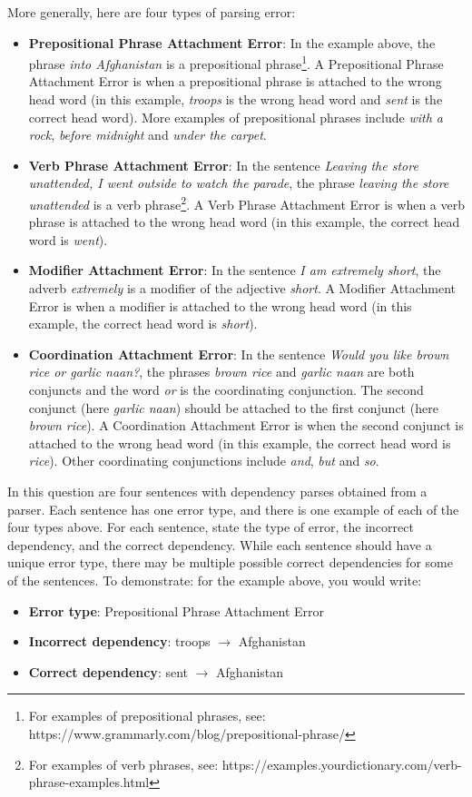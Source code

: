 \begin{parts}
More generally, here are four types of parsing error:
\begin{itemize}
    \item \textbf{Prepositional Phrase Attachment Error}: In the example above, the phrase \textit{into Afghanistan} is a prepositional phrase\footnote{For examples of prepositional phrases, see: https://www.grammarly.com/blog/prepositional-phrase/}.
    A Prepositional Phrase Attachment Error is when a prepositional phrase is attached to the wrong head word (in this example, \textit{troops} is the wrong head word and \textit{sent} is the correct head word).
    More examples of prepositional phrases include \textit{with a rock}, \textit{before midnight} and \textit{under the carpet}. 
    \item \textbf{Verb Phrase Attachment Error}: In the sentence \textit{Leaving the store unattended, I went outside to watch the parade}, the phrase \textit{leaving the store unattended} is a verb phrase\footnote{For examples of verb phrases, see: https://examples.yourdictionary.com/verb-phrase-examples.html}. 
    A Verb Phrase Attachment Error is when a verb phrase is attached to the wrong head word (in this example, the correct head word is \textit{went}).
    \item \textbf{Modifier Attachment Error}: In the sentence \textit{I am extremely short}, the adverb \textit{extremely} is a modifier of the adjective \textit{short}. A Modifier Attachment Error is when a modifier is attached to the wrong head word (in this example, the correct head word is \textit{short}).
    \item \textbf{Coordination Attachment Error}: In the sentence \textit{Would you like brown rice or garlic naan?}, the phrases \textit{brown rice} and \textit{garlic naan} are both conjuncts and the word \textit{or} is the coordinating conjunction. The second conjunct (here \textit{garlic naan}) should be attached to the first conjunct (here \textit{brown rice}). A Coordination Attachment Error is when the second conjunct is attached to the wrong head word (in this example, the correct head word is \textit{rice}). Other coordinating conjunctions include \textit{and}, \textit{but} and \textit{so}.
\end{itemize}
In this question are four sentences with dependency parses obtained from a parser. Each sentence has one error type, and there is one example of each of the four types above. 
For each sentence, state the type of error, the incorrect dependency, and the correct dependency. While each sentence should have a unique error type, there may be multiple possible correct dependencies for some of the sentences.
To demonstrate: for the example above, you would write: 
\begin{itemize}
    \item \textbf{Error type}: Prepositional Phrase Attachment Error 
    \item \textbf{Incorrect dependency}: troops $\rightarrow$ Afghanistan 
    \item \textbf{Correct dependency}: sent $\rightarrow$ Afghanistan
\end{itemize}


\end{parts}
